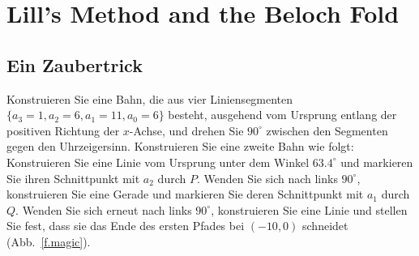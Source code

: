 
\chapter{Lill's Method and the Beloch Fold}\label{c.origami-cube}


\section{Ein Zaubertrick}\label{s.magic}


Konstruieren Sie eine Bahn, die aus vier Liniensegmenten $\{a_3=1,a_2=6,a_1=11,a_0=6\}$ besteht, ausgehend vom Ursprung entlang der positiven Richtung der $x$-Achse, und drehen Sie $90^\circ$ zwischen den Segmenten gegen den Uhrzeigersinn. Konstruieren Sie eine zweite Bahn wie folgt: Konstruieren Sie eine Linie vom Ursprung unter dem Winkel $63.4^\circ$ und markieren Sie ihren Schnittpunkt mit $a_2$ durch $P$. Wenden Sie sich nach links $90^\circ$, konstruieren Sie eine Gerade und markieren Sie deren Schnittpunkt mit $a_1$ durch $Q$. Wenden Sie sich erneut nach links $90^\circ$, konstruieren Sie eine Linie und stellen Sie fest, dass sie das Ende des ersten Pfades bei $(-10,0)$ schneidet (Abb.~\ref{f.magic}).

